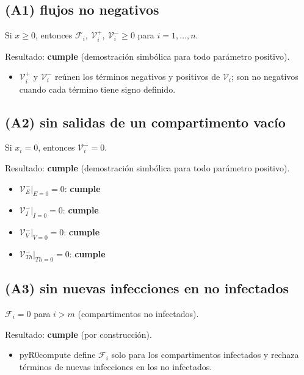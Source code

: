 \documentclass{article}
\begin{document}
\subsection*{(A1) flujos no negativos}

Si $x \ge 0$, entonces $\mathcal{F}_i,\ \mathcal{V}_i^+,\ \mathcal{V}_i^- \ge 0$ para $i = 1,\dots,n$.

Resultado: \textbf{cumple} (demostración simbólica para todo parámetro positivo).

\begin{itemize}
  \item $\mathcal{V}_i^+$ y $\mathcal{V}_i^-$ reúnen los términos negativos y positivos de $\mathcal{V}_i$; son no negativos cuando cada término tiene signo definido.
\end{itemize}

\subsection*{(A2) sin salidas de un compartimento vacío}

Si $x_i = 0$, entonces $\mathcal{V}_i^- = 0$.

Resultado: \textbf{cumple} (demostración simbólica para todo parámetro positivo).

\begin{itemize}
  \item $\left.\mathcal{V}_{E}^-\right\rvert_{E = 0} = 0$: \textbf{cumple}
  \item $\left.\mathcal{V}_{I}^-\right\rvert_{I = 0} = 0$: \textbf{cumple}
  \item $\left.\mathcal{V}_{V}^-\right\rvert_{V = 0} = 0$: \textbf{cumple}
  \item $\left.\mathcal{V}_{Th}^-\right\rvert_{Th = 0} = 0$: \textbf{cumple}
\end{itemize}

\subsection*{(A3) sin nuevas infecciones en no infectados}

$\mathcal{F}_i = 0$ para $i > m$ (compartimentos no infectados).

Resultado: \textbf{cumple} (por construcción).

\begin{itemize}
  \item pyR0compute define $\mathcal{F}_i$ solo para los compartimentos infectados y rechaza términos de nuevas infecciones en los no infectados.
\end{itemize}
\end{document}
